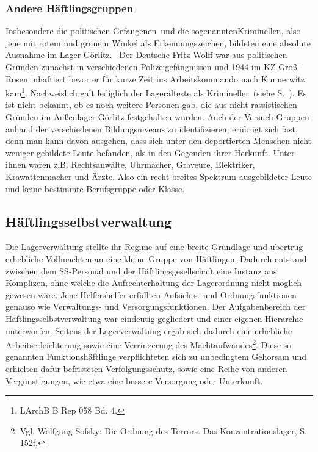 \subsubsection{Andere Häftlingsgruppen}%
Insbesondere die \glqq politischen Gefangenen\grqq~und die sogenannten\glqq Kriminellen\grqq, also jene mit rotem und grünem Winkel als Erkennungszeichen, bildeten eine absolute Ausnahme im Lager Görlitz.~\newline
Der Deutsche Fritz Wolff war aus politischen Gründen zunächst in verschiedenen Polizeigefängnissen und 1944 im KZ Groß-Rosen inhaftiert bevor er für kurze Zeit ins Arbeitskommando nach Kunnerwitz kam\footnote{LArchB B Rep 058 Bd. 4.}. Nachweislich galt lediglich der Lagerälteste als \glqq Krimineller\grqq~(siehe S.~\pageref{czech}). Es ist nicht bekannt, ob es noch weitere Personen gab, die aus nicht rassistischen Gründen im Außenlager Görlitz festgehalten wurden.
\newline
Auch der Versuch Gruppen anhand der verschiedenen Bildungsniveaus zu identifizieren, erübrigt sich fast, denn man kann davon ausgehen, dass sich unter den deportierten Menschen nicht weniger gebildete Leute befanden, als in den Gegenden ihrer Herkunft. Unter ihnen waren z.B. Rechtsanwälte, Uhrmacher, Graveure, Elektriker, Krawattenmacher und Ärzte. Also ein recht breites Spektrum ausgebildeter Leute und keine bestimmte Berufsgruppe oder Klasse.

\subsection{Häftlingsselbstverwaltung}
Die Lagerverwaltung stellte ihr Regime auf eine breite Grundlage und übertrug erhebliche Vollmachten an eine kleine Gruppe von Häftlingen. Dadurch entstand zwischen dem SS-Personal und der Häftlingsgesellschaft eine Instanz aus Komplizen, ohne welche die Aufrechterhaltung der Lagerordnung nicht möglich gewesen wäre. Jene Helfershelfer erfüllten Aufsichts- und Ordnungsfunktionen genauso wie Verwaltungs- und Versorgungsfunktionen. Der Aufgabenbereich der Häftlingsselbstverwaltung war eindeutig gegliedert und einer eigenen Hierarchie unterworfen. Seitens der Lagerverwaltung ergab sich dadurch eine erhebliche Arbeitserleichterung sowie eine Verringerung des Machtaufwandes\footnote{Vgl. Wolfgang Sofsky: Die Ordnung des Terrors. Das Konzentrationslager, S. 152f.}. Diese so genannten Funktionshäftlinge verpflichteten sich zu unbedingtem Gehorsam und erhielten dafür befristeten Verfolgungsschutz, sowie eine Reihe von anderen Vergünstigungen, wie etwa eine bessere Versorgung oder Unterkunft.

